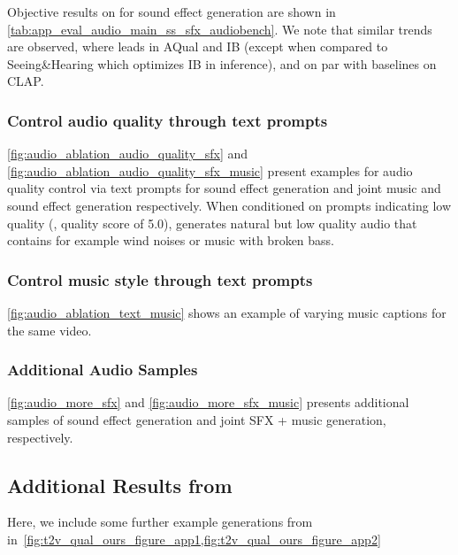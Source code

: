 Objective results on \OursAudioBench for sound effect generation are shown in \cref{tab:app_eval_audio_main_ss_sfx_audiobench}. We note that similar trends are observed, where \OursAudio leads in AQual and IB (except when compared to Seeing\&Hearing which optimizes IB in inference), and on par with baselines on CLAP.

\subsubsection{Control audio quality through text prompts}\label{app:qual_control}
\cref{fig:audio_ablation_audio_quality_sfx} and \cref{fig:audio_ablation_audio_quality_sfx_music} present examples for audio quality control via text prompts for sound effect generation and joint music and sound effect generation respectively.
When conditioned on prompts indicating low quality (\ie, quality score of 5.0), \OursAudio generates natural but low quality audio that contains for example wind noises or music with broken bass.




\subsubsection{Control music style through text prompts}\label{app:music_control}
\cref{fig:audio_ablation_text_music} shows an example of varying music captions for the same video.



\subsubsection{Additional Audio Samples}\label{app:audio_samples}
\cref{fig:audio_more_sfx} and \cref{fig:audio_more_sfx_music} presents additional samples of sound effect generation and joint SFX + music generation, respectively.




\clearpage
\subsection{Additional Results from \OursVideo}
Here, we include some further example generations from \OursVideo in~\cref{fig:t2v_qual_ours_figure_app1,fig:t2v_qual_ours_figure_app2}




